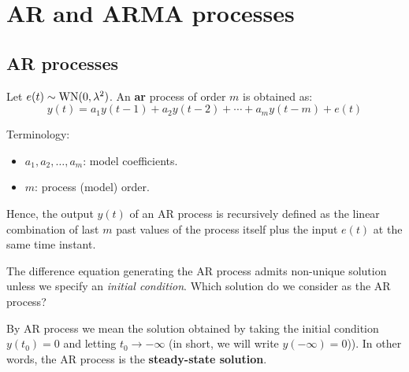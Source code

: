 \section{AR and ARMA processes}

\subsection{AR processes}

\begin{definition}
	Let $e(t) \sim \operatorname{WN}(0, \lambda^{2})$. An \textbf{\gls{ar}} process of order $m$ is obtained as:
	\[
		\boxed{y(t)=a_{1} y(t-1)+a_{2} y(t-2)+\cdots+a_{m} y(t-m)+e(t)}
	\]
\end{definition}

Terminology:
\begin{itemize}
	\item $a_{1}, a_{2}, \ldots, a_{m}$: model coefficients.
	\item $m$: process (model) order.
\end{itemize}
 
Hence, the output $y(t)$ of an AR process is recursively defined as the linear combination of last $m$ past values of the process itself plus the input $e(t)$ at the same time instant.

\begin{obs}
The difference equation generating the AR process admits non-unique solution unless we specify an \emph{initial condition}. Which solution do we consider as the AR process?

By AR process we mean the solution obtained by taking the initial condition $\boxed{y(t_{0})=0}$ and letting $t_{0} \to -\infty$ (in short, we will write $y(-\infty)=0$)). In other words, the AR process is the \textbf{steady-state solution}.
\end{obs}


